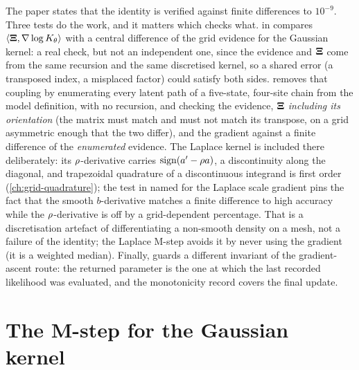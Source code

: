 The paper states that the identity is verified against finite differences to
$10^{-9}$. Three tests do the work, and it matters which checks what.
 in
 compares $\langle\mathbf{\Xi},\nabla\log K_{\theta}\rangle$ with a
central difference of the grid evidence for the Gaussian kernel: a real check, but not
an independent one, since the evidence and $\mathbf{\Xi}$ come from the same recursion and the
same discretised kernel, so a shared error (a transposed index, a misplaced factor)
could satisfy both sides.  removes that
coupling by enumerating every latent path of a five-state, four-site chain from the
model definition, with no recursion, and checking the evidence, $\mathbf{\Xi}$ \emph{including
its orientation} (the matrix must match and must not match its transpose, on a grid
asymmetric enough that the two differ), and the gradient against a finite difference of
the \emph{enumerated} evidence. The Laplace kernel is included there deliberately: its
$\rho$-derivative carries $\operatorname{sign}(a'-\rho a)$, a discontinuity along the
diagonal, and trapezoidal quadrature of a discontinuous integrand is first order
(\cref{ch:grid-quadrature}); the test in  named for the
Laplace scale gradient pins the fact that the smooth $b$-derivative matches a finite
difference to high accuracy while the $\rho$-derivative is off by a grid-dependent
percentage. That is a discretisation artefact of differentiating a non-smooth density
on a mesh, not a failure of the identity; the Laplace M-step avoids it by never using
the gradient (it is a weighted median). Finally,
 guards a different invariant of the
gradient-ascent route: the returned parameter is the one at which the last recorded
likelihood was evaluated, and the monotonicity record covers the final update.

\section{The M-step for the Gaussian kernel}

